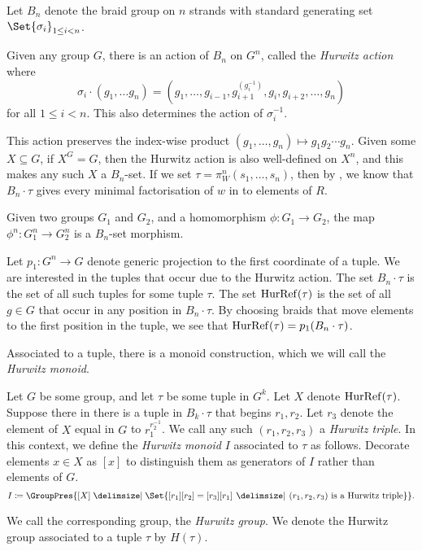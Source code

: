 Let  $B_n$ denote the braid group on  $n$ strands with standard generating set $\Set{\sigma_i}_{1 \leq i < n} $.
\begin{definition}
	Given any group $G$, there is an action of  $B_n$ on  $G^n$, called the \emph{Hurwitz action} where
	\[
		\sigma_i \cdot  \left( g_1, \ldots g_n \right) = \left( g_1,\ldots,g_{i-1}, g_{i+1}^{\left(g_i^{-1}\right)}, g_{i}, g_{i+2}, \ldots, g_n \right)
	\]
	for all $1\leq i<n$.
	This also determines the action of $\sigma_i^{-1}$.
\end{definition}
This action preserves the index-wise product $(g_1, \ldots, g_n) \mapsto g_1g_2\cdots g_n$.
Given some $X \subseteq G$, if $X^G = G$, then the Hurwitz action is also well-defined on $X^n$, and this makes any such $X$ a  $B_n$-set.
If we set $\tau = \pi^n_W(s_1,\ldots,s_n)$, then by \cite{igusa_schiffler_exceptional_2010}, we know that $B_n \cdot \tau$ gives every minimal factorisation of  $w$ in to elements of $R$.

\begin{remark}
	\label{rmk:hurwitz_action_Bn_set_morphism}
	Given two groups $G_1$ and  $G_2$, and a homomorphism $\phi \colon G_1 \to G_2$, the map $\phi^n \colon G_1^n \to G_2^n$ is a  $B_n$-set morphism.
\end{remark}
Let $p_1 \colon G^n \to G$ denote generic projection to the first coordinate of a tuple.
We are interested in the tuples that occur due to the Hurwitz action.
The set $B_n \cdot \tau$ is the set of all such tuples for some tuple  $\tau$.
The set $\operatorname{HurRef}(\tau)$ is the set of all  $g \in G$ that occur in any position in  $B_n \cdot \tau$.
By choosing braids that move elements to the first position in the tuple, we see that $\operatorname{HurRef}(\tau) = p_1(B_n \cdot \tau)$.

Associated to a tuple, there is a monoid construction, which we will call the \emph{Hurwitz monoid}.
\begin{definition}
	Let $G$ be some group, and let $\tau$ be some tuple  in $G^k$.
	Let $X$ denote  $\operatorname{HurRef}(\tau)$.
	Suppose there in there is a tuple in  $B_k \cdot \tau$ that begins $r_1,r_2$.
	Let $r_3$ denote the element of $X$ equal in $G$ to  $r_1^{r_2^{-1}}$.
	We call any such $(r_1,r_2,r_3)$ a \emph{Hurwitz triple}.
	In this context, we define the \emph{Hurwitz monoid} $I$ associated to $\tau$ as follows.
	Decorate elements $x \in X$ as $[x]$ to distinguish them as generators of $I$ rather than elements of $G$.
	\[
		I \coloneq \GroupPres{[X] \relations \Set{ [r_1][r_2] = [r_3][r_1] \given (r_1,r_2,r_3) \text{ is a Hurwitz triple}}}
		.\]
\end{definition}
We call the corresponding group, the \emph{Hurwitz group}.
We denote the Hurwitz group associated to a tuple $\tau$ by  $H(\tau)$.

